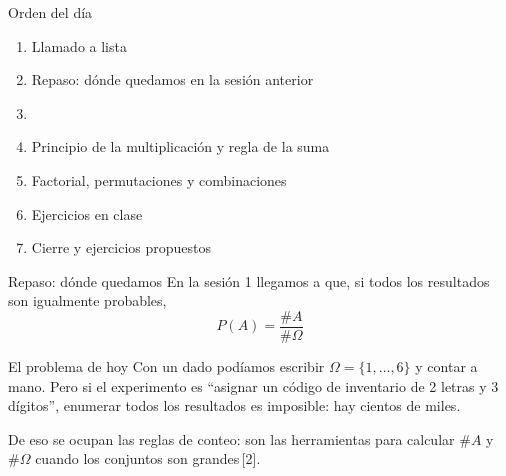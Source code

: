 \documentclass[aspectratio=169,10pt]{beamer}
\begin{document}
\portada

\begin{frame}{Orden del día}
  \begin{enumerate}
    \item Llamado a lista
    \item Repaso: dónde quedamos en la sesión anterior
    \item {}
    \item Principio de la multiplicación y regla de la suma
    \item Factorial, permutaciones y combinaciones
    \item Ejercicios en clase
    \item Cierre y ejercicios propuestos
  \end{enumerate}
\end{frame}

\begin{frame}{Repaso: dónde quedamos}
  En la sesión 1 llegamos a que, si todos los resultados son igualmente
  probables,
  \[ P(A)=\frac{\#A}{\#\Omega} \]

  \vspace{0.2cm}
  \begin{alertblock}{El problema de hoy}
    \footnotesize
    Con un dado podíamos escribir $\Omega=\{1,\dots,6\}$ y contar a mano. Pero
    si el experimento es ``asignar un código de inventario de 2 letras y 3
    dígitos'', enumerar todos los resultados es imposible: hay cientos de
    miles. 
  \end{alertblock}

  \vspace{0.2cm}
  {\footnotesize\color{uniGris} De eso se ocupan las reglas de conteo: son las
  herramientas para calcular $\#A$ y $\#\Omega$ cuando los conjuntos son
  grandes\,[2].}
\end{frame}

\end{document}

